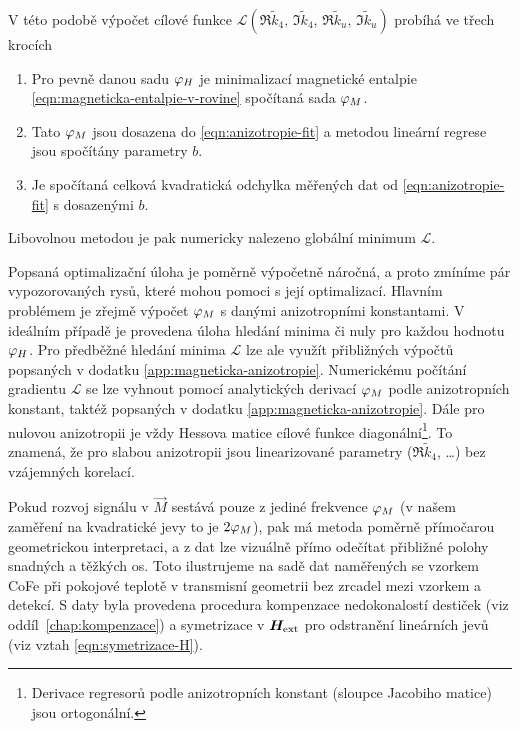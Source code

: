 V této podobě výpočet cílové funkce $\mathcal{L}(\Re\tilde{k}_4,\,\Im\tilde{k}_4,\,\Re\tilde{k}_u,\,\Im\tilde{k}_u)$ probíhá ve třech krocích
\begin{enumerate}
    \item Pro pevně danou sadu $\varphi_H$ je minimalizací magnetické entalpie \eqref{eqn:magneticka-entalpie-v-rovine} spočítaná sada $\varphi_M$.
    \item Tato $\varphi_M$ jsou dosazena do \eqref{eqn:anizotropie-fit} a metodou lineární regrese jsou spočítány parametry $b$.
    \item Je spočítaná celková kvadratická odchylka měřených dat od \eqref{eqn:anizotropie-fit} s dosazenými $b$.
\end{enumerate}
Libovolnou metodou je pak numericky nalezeno globální minimum $\mathcal{L}$.

Popsaná optimalizační úloha je poměrně výpočetně náročná, a proto zmíníme pár vypozorovaných rysů, které mohou pomoci s její optimalizací.
Hlavním problémem je zřejmě výpočet $\varphi_M$ s danými anizotropními konstantami.
V ideálním případě je provedena úloha hledání minima či nuly pro každou hodnotu $\varphi_H$.
Pro předběžné hledání minima $\mathcal{L}$ lze ale využít přibližných výpočtů popsaných v dodatku \ref{app:magneticka-anizotropie}.
Numerickému počítání gradientu $\mathcal{L}$ se lze vyhnout pomocí analytických derivací $\varphi_M$ podle anizotropních konstant, taktéž popsaných v dodatku \ref{app:magneticka-anizotropie}.
Dále pro nulovou anizotropii je vždy Hessova matice cílové funkce diagonální\footnote{Derivace regresorů podle anizotropních konstant (sloupce Jacobiho matice) jsou ortogonální.}.
To znamená, že pro slabou anizotropii jsou linearizované parametry ($\Re \tilde{k}_4$, \ldots) bez vzájemných korelací.

Pokud rozvoj signálu v $\vec{M}$ sestává pouze z jediné frekvence $\varphi_M$ (v našem zaměření na kvadratické jevy to je $2\varphi_M$), pak má metoda poměrně přímočarou geometrickou interpretaci, a z dat lze vizuálně přímo odečítat přibližné polohy snadných a těžkých os.
Toto ilustrujeme na sadě dat naměřených se vzorkem CoFe při pokojové teplotě v transmisní geometrii bez zrcadel mezi vzorkem a detekcí.
S daty byla provedena procedura kompenzace nedokonalostí destiček (viz oddíl~\ref{chap:kompenzace}) a symetrizace v $\bm{H}_\textrm{ext}$ pro odstranění lineárních jevů (viz vztah \eqref{eqn:symetrizace-H}).

